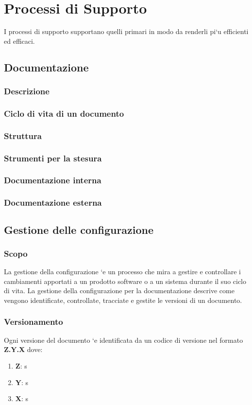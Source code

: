 \section{Processi di Supporto}
I processi di supporto supportano quelli primari in modo da renderli pi`u efficienti ed efficaci.
    \subsection{Documentazione}
        \subsubsection{Descrizione}
        \subsubsection{Ciclo di vita di un documento}
        \subsubsection{Struttura}
        \subsubsection{Strumenti per la stesura}
        \subsubsection{Documentazione interna}
        \subsubsection{Documentazione esterna}

    \subsection{Gestione delle configurazione}
        \subsubsection{Scopo}
        La gestione della configurazione `e un processo che mira a gestire e controllare i cambiamenti apportati
        a un prodotto software o a un sistema durante il suo ciclo di vita. La gestione della configurazione per
        la documentazione descrive come vengono identificate, controllate, tracciate e gestite le versioni di un
        documento.
        \subsubsection{Versionamento}
        Ogni versione del documento `e identificata da un codice di versione nel formato \textbf{Z.Y.X} dove:
        \begin{enumerate}
            \item \textbf{Z}: s
            \item \textbf{Y}: s
            \item \textbf{X}: s
        \end{enumerate}

